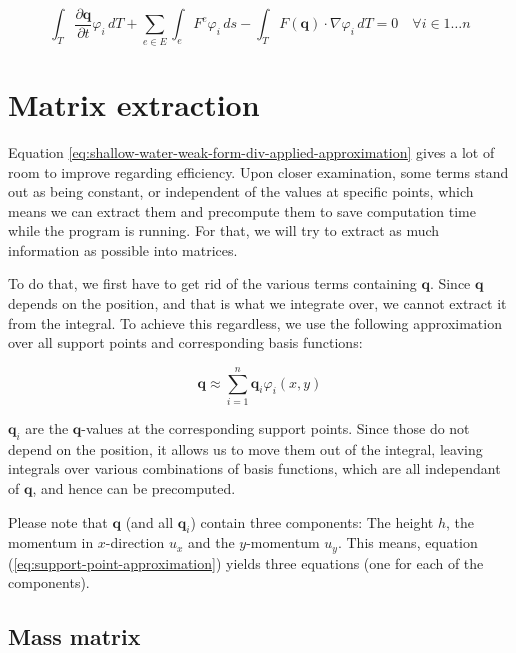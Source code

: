 \documentclass{article}
\newcommand{\pd}[2]{\dfrac{\partial #1}{\partial #2}}
\renewcommand{\phi}{\varphi}
\begin{document}
\begin{equation}
  \label{eq:shallow-water-weak-form-div-applied-approximation}
  \int_T \pd {\mathbf{q}}{t} \phi_i \, dT +
  \sum_{e \in E} \int_{e} F^e \phi_i \, ds  -
  \int_T F(\mathbf{q}) \cdot \nabla \phi_i \, dT = 0
  \quad \forall i \in {1 \dots n}
\end{equation}

\section{Matrix extraction}
\label{sec:matrix-extraction}

Equation \ref{eq:shallow-water-weak-form-div-applied-approximation} gives a lot of room to improve regarding efficiency. Upon closer examination, some terms stand out as being constant, or independent of the values at specific points, which means we can extract them and precompute them to save computation time while the program is running. For that, we will try to extract as much information as possible into matrices.

To do that, we first have to get rid of the various terms containing $\mathbf{q}$. Since $\mathbf{q}$ depends on the position, and that is what we integrate over, we cannot extract it from the integral. To achieve this regardless, we use the following approximation over all support points and corresponding basis functions:

\begin{equation}
  \label{eq:support-point-approximation}
  \mathbf{q} \approx \sum_{i=1}^n \mathbf{q}_i \phi_i\left(x,y\right)
\end{equation}

$\mathbf{q}_i$ are the $\mathbf{q}$-values at the corresponding support points. Since those do not depend on the position, it allows us to move them out of the integral, leaving integrals over various combinations of basis functions, which are all independant of $\mathbf{q}$, and hence can be precomputed.

Please note that $\mathbf{q}$ (and all $\mathbf{q}_i$) contain three components: The height $h$, the momentum in $x$-direction $u_x$ and the $y$-momentum $u_y$. This means, equation (\ref{eq:support-point-approximation}) yields three equations (one for each of the components).

\subsection{Mass matrix}
\label{sec:mass-matrix}
\end{document}
